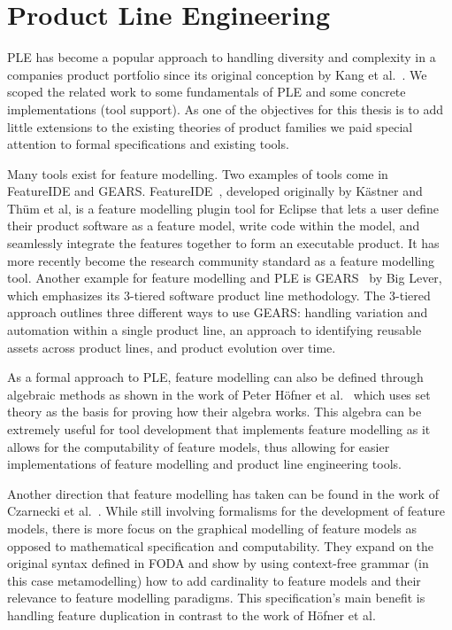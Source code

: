 \section{Product Line Engineering}

\ac{PLE} has become a popular approach to handling diversity and complexity in a companies product portfolio since its original conception by Kang et al.~\cite{kang1990feature, kang2002feature}. We scoped the related work to some fundamentals of \ac{PLE} and some concrete implementations (tool support). As one of the objectives for this thesis is to add little extensions to the existing theories of product families we paid special attention to formal specifications and existing tools.

Many tools exist for feature modelling. Two examples of tools come in FeatureIDE and GEARS. FeatureIDE~\cite{kastner2009featureide, thum2014featureide}, developed originally by K\"{a}stner and Th{\"u}m et al, is a feature modelling plugin tool for Eclipse that lets a user define their product software as a feature model, write code within the model, and seamlessly integrate the features together to form an executable product. It has more recently become the research community standard as a feature modelling tool. Another example for feature modelling and PLE is GEARS~\cite{GEARS} by Big Lever, which emphasizes its 3-tiered software product line methodology. The 3-tiered approach outlines three different ways to use GEARS: handling variation and automation within a single product line, an approach to identifying reusable assets across product lines, and product evolution over time. 

As a formal approach to \ac{PLE}, feature modelling can also be defined through algebraic methods as shown in the work of Peter H\"{o}fner et al.~\cite{hofner2006feature,hofner2011algebra} which uses set theory as the basis for proving how their algebra works. This algebra can be extremely useful for tool development that implements feature modelling as it allows for the computability of feature models, thus allowing for easier implementations of feature modelling and product line engineering tools.

Another direction that feature modelling has taken can be found in the work of Czarnecki et al.~\cite{czarnecki2004staged}. While still involving formalisms for the development of feature models, there is more focus on the graphical modelling of feature models as opposed to mathematical specification and computability. They expand on the original syntax defined in FODA and show by using context-free grammar (in this case metamodelling) how to add cardinality to feature models and their relevance to feature modelling paradigms. This specification's main benefit is handling feature duplication in contrast to the work of H\"{o}fner et al.

